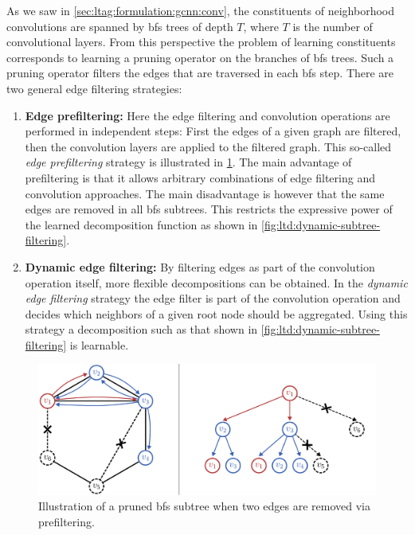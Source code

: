 As we saw in \cref{sec:ltag:formulation:gcnn:conv}, the constituents of neighborhood convolutions are spanned by \ac{bfs} trees of depth $T$, where $T$ is the number of convolutional layers.
From this perspective the problem of learning constituents corresponds to learning a pruning operator on the branches of \ac{bfs} trees.
Such a pruning operator filters the edges that are traversed in each \ac{bfs} step.
There are two general edge filtering strategies:
\begin{enumerate}[label={\textbf{\arabic*.}}]
	\item \textbf{Edge prefiltering:}
		Here the edge filtering and convolution operations are performed in independent steps:
		First the edges of a given graph are filtered, then the convolution layers are applied to the filtered graph.
		This so-called \textit{edge prefiltering} strategy is illustrated in \cref{fig:ltd:subtree-filtering}.
		The main advantage of prefiltering is that it allows arbitrary combinations of edge filtering and convolution approaches.
		The main disadvantage is however that the same edges are removed in all \ac{bfs} subtrees.
		This restricts the expressive power of the learned decomposition function as shown in \cref{fig:ltd:dynamic-subtree-filtering}.
	\item \textbf{Dynamic edge filtering:}
		By filtering edges as part of the convolution operation itself, more flexible decompositions can be obtained.
		In the \textit{dynamic edge filtering} strategy the edge filter is part of the convolution operation and decides which neighbors of a given root node should be aggregated.
		Using this strategy a decomposition such as that shown in \cref{fig:ltd:dynamic-subtree-filtering} is learnable.
\end{enumerate}
\begin{figure}[ht]
	\centering
	\includegraphics[width=0.8\linewidth]{gfx/ltd/subtree-filtering.pdf}
	\caption{Illustration of a pruned \ac{bfs} subtree when two edges are removed via prefiltering.}\label{fig:ltd:subtree-filtering}
\end{figure}
